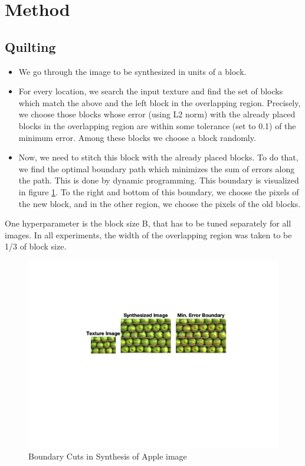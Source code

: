 \documentclass[10pt,twocolumn,letterpaper]{article}
\begin{document}
\section{Method}

\subsection{Quilting}
\begin{itemize}
\item We go through the image to be synthesized in units of a block. 
\item For every location, we search the input texture and find the set of blocks which match the above and the left block in the overlapping region. Precisely, we choose those blocks whose error (using L2 norm) with the already placed blocks in the overlapping region are within some tolerance (set to 0.1) of the minimum error. Among these blocks we choose a block randomly.
\item Now, we need to stitch this block with the already placed blocks. To do that, we find the optimal boundary path which minimizes the sum of errors along the path. This is done by dynamic programming. This boundary is visualized in figure \ref{fig:bcut_example}. To the right and bottom of this boundary, we choose the pixels of the new block, and in the other region, we choose the pixels of the old blocks.
\end{itemize}
One hyperparameter is the block size B, that has to be tuned separately for all images. In all experiments, the width of the overlapping region was taken to be 1/3 of block size.
\begin{figure}[h]
\begin{center}
\includegraphics[trim={9cm 15cm 2cm 8cm},clip, scale=0.38]{resources/apple_boundary_example.png}
\end{center}
\vspace{-0.2em}
\caption{Boundary Cuts in Synthesis of Apple image}
\label{fig:bcut_example}
\end{figure}
\end{document}
